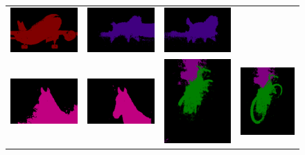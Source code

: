 \begin{figure}[H]
\begin{tabular}{c c c c}
    \includegraphics[width=0.18\linewidth, height=0.18\linewidth]{figures/ablation/withrfm/2011_001753_[0]} & \hspace{2pt}
    \includegraphics[width=0.18\linewidth, height=0.18\linewidth]{figures/ablation/withoutrfm/2011_002398_[11]} &
    \includegraphics[width=0.18\linewidth, height=0.18\linewidth]{figures/ablation/withrfm/2011_002398_[11]} \\
    [1mm]
    \includegraphics[width=0.18\linewidth, height=0.18\linewidth]{figures/ablation/withoutrfm/2007_009807_[12]} &
    \includegraphics[width=0.18\linewidth, height=0.18\linewidth]{figures/ablation/withrfm/2007_009807_[12]} & \hspace{2pt}
    \includegraphics[width=0.18\linewidth, height=0.18\linewidth]{figures/ablation/withoutrfm/2010_003912_[1, 4]} &
    \includegraphics[width=0.18\linewidth, height=0.18\linewidth]{figures/ablation/withrfm/2010_003912_[1, 4]} \\

\end{tabular}
\end{figure}
